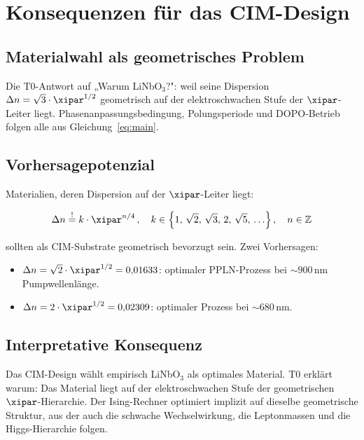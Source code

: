 \clearpage

\section{Konsequenzen für das CIM-Design}
\label{sec:konsequenzen}

\subsection{Materialwahl als geometrisches Problem}

Die T0-Antwort auf „Warum LiNbO$_3$?": weil seine Dispersion
$\Delta n = \sqrt{3}\cdot\xipar^{1/2}$ geometrisch auf der elektroschwachen
Stufe der $\xipar$-Leiter liegt. Phasenanpassungsbedingung, Polungsperiode
und DOPO-Betrieb folgen alle aus Gleichung~\eqref{eq:main}.

\subsection{Vorhersagepotenzial}

Materialien, deren Dispersion auf der $\xipar$-Leiter liegt:

\begin{equation}
    \Delta n \stackrel{!}{=} k\cdot\xipar^{n/4}\,,
    \quad k \in \left\{1,\,\sqrt{2},\,\sqrt{3},\,2,\,\sqrt{5},\,\ldots\right\},
    \quad n \in \mathbb{Z}
\end{equation}

sollten als CIM-Substrate geometrisch bevorzugt sein. Zwei Vorhersagen:

\begin{itemize}
    \item $\Delta n = \sqrt{2}\cdot\xipar^{1/2} = 0{,}01633$:
    optimaler PPLN-Prozess bei $\sim 900\,\text{nm}$ Pumpwellenlänge.
    \item $\Delta n = 2\cdot\xipar^{1/2} = 0{,}02309$:
    optimaler Prozess bei $\sim 680\,\text{nm}$.
\end{itemize}

\subsection{Interpretative Konsequenz}

Das CIM-Design wählt empirisch LiNbO$_3$ als optimales Material.
T0 erklärt warum: Das Material liegt auf der elektroschwachen Stufe
der geometrischen $\xipar$-Hierarchie. Der Ising-Rechner optimiert
implizit auf dieselbe geometrische Struktur, aus der auch die schwache
Wechselwirkung, die Leptonmassen und die Higgs-Hierarchie folgen.

